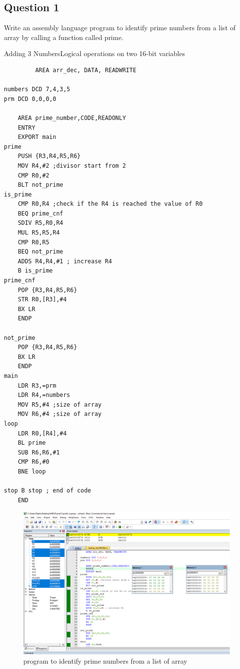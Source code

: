 \documentclass[11pt]{article}
\begin{document}
\subsection{Question 1}
Write an assembly language program to identify prime numbers from a list of array by calling a function called prime.
\begin{listing}[h]
    \caption{Adding 3 NumbersLogical operations on two 16-bit variables}
    \begin{verbatim}
         AREA arr_dec, DATA, READWRITE

numbers DCD 7,4,3,5
prm DCD 0,0,0,0
	
	AREA prime_number,CODE,READONLY
	ENTRY
	EXPORT main
prime
	PUSH {R3,R4,R5,R6}
	MOV R4,#2 ;divisor start from 2
	CMP R0,#2
	BLT not_prime
is_prime
	CMP R0,R4 ;check if the R4 is reached the value of R0
	BEQ prime_cnf
	SDIV R5,R0,R4
	MUL R5,R5,R4 
	CMP R0,R5
	BEQ not_prime
	ADDS R4,R4,#1 ; increase R4
	B is_prime
prime_cnf
	POP {R3,R4,R5,R6}
	STR R0,[R3],#4
	BX LR
	ENDP

not_prime
	POP {R3,R4,R5,R6}
	BX LR
	ENDP
main
	LDR R3,=prm
	LDR R4,=numbers
	MOV R5,#4 ;size of array
	MOV R6,#4 ;size of array
loop
	LDR R0,[R4],#4
	BL prime
	SUB R6,R6,#1
	CMP R6,#0
	BNE loop
	
stop B stop ; end of code
	END

\end{verbatim}
\end{listing}


\clearpage
\begin{figure}[!h]
    \centering
    \includegraphics[width=\textwidth]{prob1.PNG}
    \caption{program to identify prime numbers from a list of array}
\end{figure} 
\clearpage
\end{document}
